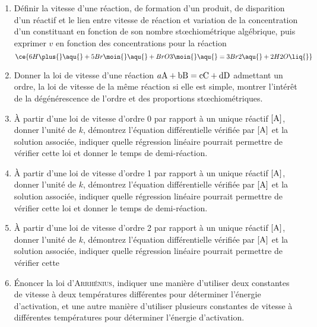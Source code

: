 \documentclass[a4paper, 12pt, final, garamond]{book}
\begin{document}
\begin{enumerate}[resume]
    \item Définir la vitesse d'une réaction, de formation d'un produit, de
        disparition d'un réactif et le lien entre vitesse de réaction et
        variation de la concentration d'un constituant en fonction de son nombre
        stœchiométrique algébrique, puis exprimer $v$ en fonction des
        concentrations pour la réaction
        \[
            \ce{6H\plus{}\aqu{} + 5Br\moin{}\aqu{} + BrO3\moin{}\aqu{}
            =
            3Br2\aqu{} + 2H2O\liq{}}
        \]
    \item Donner la loi de vitesse d'une réaction $a\rm{A} + b\rm{B} = c\rm{C}
        + d\rm{D}$ admettant un ordre, la loi de vitesse de la même réaction si
        elle est simple, montrer l'intérêt de la dégénérescence de l'ordre et
        des proportions stœchiométriques.
    \item À partir d'une loi de vitesse d'ordre 0 par rapport à un unique
        réactif $[{\rm A}]$, donner l'unité de $k$, démontrez l'équation
        différentielle vérifiée par $[{\rm A}]$ et la solution associée,
        indiquer quelle régression linéaire pourrait permettre de vérifier cette
        loi et donner le temps de demi-réaction.
    \item À partir d'une loi de vitesse d'ordre 1 par rapport à un unique
        réactif $[{\rm A}]$, donner l'unité de $k$, démontrez l'équation
        différentielle vérifiée par $[{\rm A}]$ et la solution associée,
        indiquer quelle régression linéaire pourrait permettre de vérifier cette
        loi et donner le temps de demi-réaction.
    \item À partir d'une loi de vitesse d'ordre 2 par rapport à un unique
        réactif $[{\rm A}]$, donner l'unité de $k$, démontrez l'équation
        différentielle vérifiée par $[{\rm A}]$ et la solution associée,
        indiquer quelle régression linéaire pourrait permettre de vérifier cette
    \item Énoncer la loi d'\textsc{Arrhénius}, indiquer une manière d'utiliser
        deux constantes de vitesse à deux températures différentes pour
        déterminer l'énergie d'activation, et une autre manière d'utiliser
        plusieurs constantes de vitesse à différentes températures pour
        déterminer l'énergie d'activation.
\end{enumerate}
\end{document}
